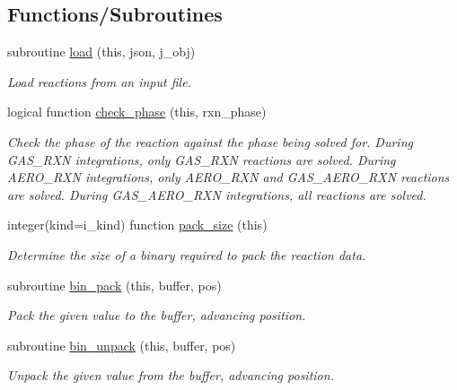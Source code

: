 \subsection*{Functions/\+Subroutines}
\begin{DoxyCompactItemize}
\item 
subroutine \mbox{\hyperlink{namespacepmc__rxn__data_abfbacb2e0a28ac87aa328f1f10dd4d8d}{load}} (this, json, j\+\_\+obj)
\begin{DoxyCompactList}\small\item\em Load reactions from an input file. \end{DoxyCompactList}\item 
logical function \mbox{\hyperlink{namespacepmc__rxn__data_a17716152aaaf50baf0bb3f07e9ede935}{check\+\_\+phase}} (this, rxn\+\_\+phase)
\begin{DoxyCompactList}\small\item\em Check the phase of the reaction against the phase being solved for. During G\+A\+S\+\_\+\+R\+XN integrations, only G\+A\+S\+\_\+\+R\+XN reactions are solved. During A\+E\+R\+O\+\_\+\+R\+XN integrations, only A\+E\+R\+O\+\_\+\+R\+XN and G\+A\+S\+\_\+\+A\+E\+R\+O\+\_\+\+R\+XN reactions are solved. During G\+A\+S\+\_\+\+A\+E\+R\+O\+\_\+\+R\+XN integrations, all reactions are solved. \end{DoxyCompactList}\item 
integer(kind=i\+\_\+kind) function \mbox{\hyperlink{namespacepmc__rxn__data_a0341adf3312d7d9b72c09ec6ec8aa869}{pack\+\_\+size}} (this)
\begin{DoxyCompactList}\small\item\em Determine the size of a binary required to pack the reaction data. \end{DoxyCompactList}\item 
subroutine \mbox{\hyperlink{namespacepmc__rxn__data_a397299ecd34b75d7ad2d796c4aceb359}{bin\+\_\+pack}} (this, buffer, pos)
\begin{DoxyCompactList}\small\item\em Pack the given value to the buffer, advancing position. \end{DoxyCompactList}\item 
subroutine \mbox{\hyperlink{namespacepmc__rxn__data_a34d8d3f14de156535b1d784d320f459b}{bin\+\_\+unpack}} (this, buffer, pos)
\begin{DoxyCompactList}\small\item\em Unpack the given value from the buffer, advancing position. \end{DoxyCompactList}\item 

\end{DoxyCompactItemize}

